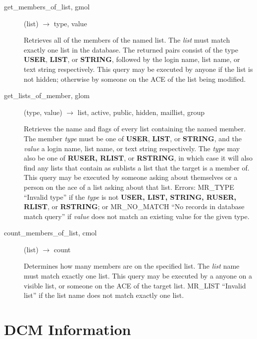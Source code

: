 \begin{description}
\item[get\_members\_of\_list, gmol](list) $\rightarrow$ type, value

Retrieves all of the members of the named list.  The {\em list} must
match exactly one list in the database.  The returned pairs consist of
the type {\bf USER}, {\bf LIST}, or {\bf STRING}, followed by the login
name, list name, or text string respectively.  This query may be
executed by anyone if the list is not hidden; otherwise by someone on
the ACE of the list being modified.

\item[get\_lists\_of\_member, glom](type, value) $\rightarrow$ list, active,
public, hidden, maillist, group

Retrieves the name and flags of every list containing the named
member.  The member {\em type} must be one of {\bf USER}, {\bf LIST}, or
{\bf STRING}, and the {\em value} a login name, list name, or text string
respectively.  The {\em type} may also be one of {\bf RUSER, RLIST}, or
{\bf RSTRING}, in which case it will also find any lists that contain as
sublists a list that the target is a member of.  This query may be
executed by someone asking about themselves or a person on the ace of
a list asking about that list.  Errors: MR\_TYPE ``Invalid type'' if the
{\em type} is not {\bf USER, LIST, STRING, RUSER, RLIST}, or {\bf RSTRING};
or MR\_NO\_MATCH ``No records in database match query'' if {\em value} does
not match an existing value for the given type.

\item[count\_members\_of\_list, cmol](list) $\rightarrow$ count

Determines how many members are on the specified list.  The {\em list}
name must match exactly one list.  This query may be executed by a
anyone on a visible list, or someone on the ACE of the target list.
MR\_LIST ``Invalid list'' if the list name does not match exactly one
list.

\end{description}

\section{DCM Information}

